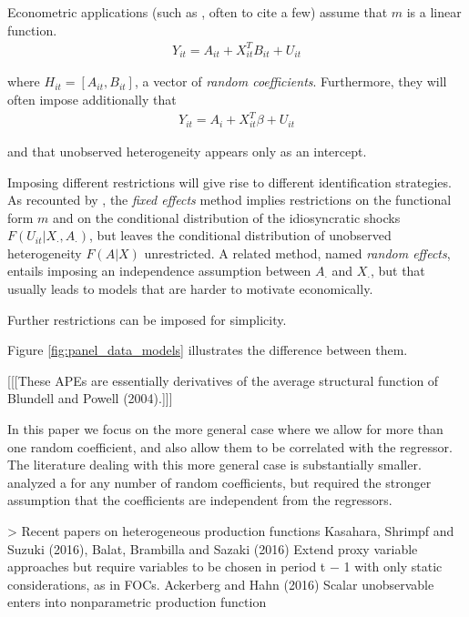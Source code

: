 Econometric applications (such as \cite{???}, \cite{???} often to cite a few) assume that $m$ is a linear function.
\begin{align}
  Y_{it} = A_{it} + X_{it}^{T}B_{it} + U_{it}
\end{align}

\noindent where $H_{it} = [A_{it}, B_{it}]$, a vector of \emph{random coefficients}. Furthermore, they will often impose additionally that 
\begin{align}
  Y_{it} = A_{i} + X_{it}^{T}\beta + U_{it}
\end{align}

and that unobserved heterogeneity appears only as an intercept.




Imposing different restrictions will give rise to different identification strategies. As recounted by \cite{graham2012identification}, the \emph{fixed effects} method implies restrictions on the functional form $m$ and on the conditional distribution of the idiosyncratic shocks $F(U_{it}|X_{\cdot}, A_{\cdot})$, but leaves the conditional distribution of unobserved heterogeneity $F(A|X)$ unrestricted. A related method, named \emph{random effects}, entails imposing an independence assumption between $A_{\cdot}$ and $X_{\cdot}$, but that usually leads to models that are harder to motivate economically.



Further restrictions can be imposed for simplicity.

Figure \ref{fig:panel_data_models} illustrates the difference between them.

[[[These APEs are essentially derivatives of the average structural function of Blundell and Powell (2004).]]]


In this paper we focus on the more general case where we allow for more than one random coefficient, and also allow them to be correlated with the regressor. The literature dealing with this more general case is substantially smaller. \citet{hoderlein2010analyzing} analyzed a for any number of random coefficients, but required the stronger assumption that the coefficients are independent from the regressors. 



> Recent papers on heterogeneous production functions Kasahara, Shrimpf and Suzuki (2016), Balat, Brambilla and Sazaki (2016)
  Extend proxy variable approaches but require variables to be chosen in period t − 1 with only static considerations, as in FOCs. Ackerberg and Hahn (2016)
  Scalar unobservable enters into nonparametric production function


